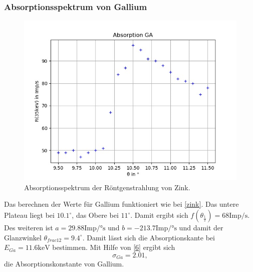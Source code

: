 \subsubsection*{Absorptionsspektrum von Gallium}
\begin{figure}[H]
  \centering
  \includegraphics{content/Ga.png}
  \caption{Absorptionsspektrum der Röntgenstrahlung von Zink.}
  \label{fig:ga}
\end{figure}
Das berechnen der Werte für Gallium funktioniert wie bei \autoref{zink}. Das untere Plateau liegt bei $10.1^\circ$, das Obere bei $11^\circ$. Damit ergibt sich $f(\theta_{\frac{1}{2}})=68 \textrm{Imp/s}$. Des weiteren ist $a=29.88 \textrm{Imp/°s}$ und $b=-213.7 \textrm{Imp/°s}$ und damit der Glanzwinkel $\theta_{frac{1}{2}}=9.4^\circ$. Damit lässt sich die Absorptionskante bei $E_{Ga}=11.6 \textrm{keV}$ bestimmen. Mit Hilfe von \eqref{6} ergibt sich 
\begin{equation*}
  \sigma_{Ga}=2.01,
\end{equation*}
die Absorptionskonstante von Gallium.

